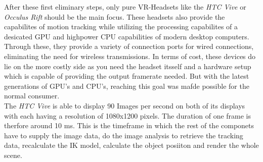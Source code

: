 After these first eliminary steps, only pure VR-Headsets like the \textit{HTC Vive} or \textit{Occulus Rift}  should be the main focus. These headsets also provide the capabilites of motion tracking while utilizing the processing capabilites of a desicated GPU and highpower CPU capabilities of modern desktop computers. Through these, they provide a variety of connection ports for wired connections, eliminating the need for wireless transmissions. In terms of cost, these devices do lie on the more costly side as you need the headset itsself and a hardware setup which is capable of providing the output framerate needed. But with the latest generations of GPU's and CPU's, reaching this goal was mafde possible for the normal consumer.\\
The \textit{HTC Vive}  is able to display 90 Images per second on both of its displays with each having a resolution of 1080x1200 pixels. The duration of one frame is therfore around 10 ms. This is the timeframe in which the rest of the componets have to supply the image data, do the image analysis to retrieve the tracking data, recalculate the IK model, calculate the object posiiton and render the whole scene.

